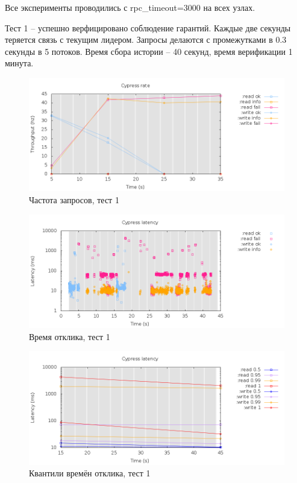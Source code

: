 \documentclass[pdftex,ptm,14pt,a4paper]{extreport}
\theoremstyle{definition}
\begin{document}
Все эксперименты проводились с rpc\_timeout=3000 на всех узлах.

Тест 1 -- успешно верфицировано соблюдение гарантий. Каждые две секунды теряется связь с текущим лидером.
Запросы делаются с промежутками в 0.3 секунды в 5 потоков.
Время сбора истории -- 40 секунд, время верификации 1 минута.

\begin{figure}[H]
    \includegraphics[scale=0.6]{cypress-2/rate.png}
    \caption{Частота запросов, тест 1}
\end{figure}

\begin{figure}[H]
    \includegraphics[scale=0.6]{cypress-2/latency-raw.png}
    \caption{Время отклика, тест 1}
\end{figure}

\begin{figure}[H]
    \includegraphics[scale=0.6]{cypress-2/latency-quantiles.png}
    \caption{Квантили времён отклика, тест 1}
\end{figure}
\end{document}
